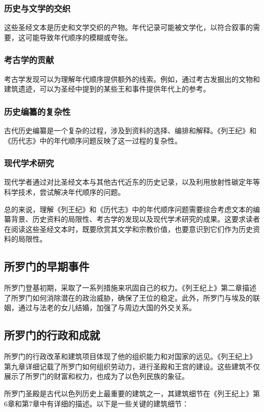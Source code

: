 \documentclass[12pt, a4paper]{ctexart}
\begin{document}
\subsubsection{历史与文学的交织}
这些圣经文本是历史和文学交织的产物。年代记录可能被文学化，以符合叙事的需要，这可能导致年代顺序的模糊或夸张。

\subsubsection{考古学的贡献}
考古学发现可以为理解年代顺序提供额外的线索。例如，通过考古发掘出的文物和建筑遗迹，可以为圣经中提到的某些王和事件提供年代上的参考。

\subsubsection{历史编纂的复杂性}
古代历史编纂是一个复杂的过程，涉及到资料的选择、编排和解释。《列王纪》和《历代志》中的年代顺序问题反映了这一过程的复杂性。

\subsubsection{现代学术研究}
现代学者通过对比圣经文本与其他古代近东的历史记录，以及利用放射性碳定年等科学技术，尝试解决年代顺序的问题。

总的来说，理解《列王纪》和《历代志》中的年代顺序问题需要综合考虑文本的编纂背景、历史资料的局限性、考古学的发现以及现代学术研究的成果。这要求读者在阅读这些圣经文本时，既要欣赏其文学和宗教价值，也要意识到它们作为历史资料的局限性。


\subsection{所罗门的早期事件}
所罗门登基初期，采取了一系列措施来巩固自己的权力。《列王纪上》第二章描述了所罗门如何消除潜在的政治威胁，确保了王位的稳定。此外，所罗门与埃及的联姻，通过与法老的女儿结婚，加强了与周边大国的外交关系。

\subsection{所罗门的行政和成就}
所罗门的行政改革和建筑项目体现了他的组织能力和对国家的远见。《列王纪上》第九章详细记载了所罗门如何组织劳动力，进行圣殿和王宫的建设。这些建筑不仅展示了所罗门的财富和权力，也成为了以色列民族的象征。

所罗门圣殿是古代以色列历史上最重要的建筑之一，其建筑细节在《列王纪上》第6章和第7章中有详细的描述。以下是一些关键的建筑细节：
\end{document}
